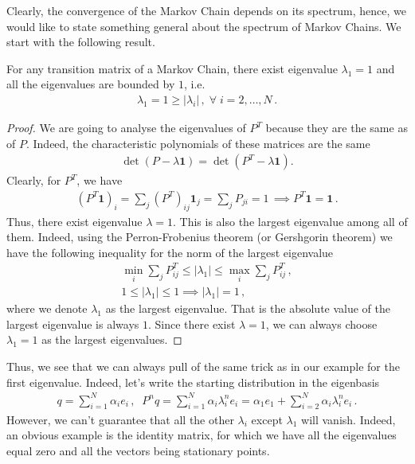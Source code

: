 Clearly, the convergence of the Markov Chain depends on its spectrum, hence, we would like to state something general about the spectrum of Markov Chains. We start with the following result.
\begin{proposition}
    For any transition matrix of a Markov Chain, there exist eigenvalue $\lambda_1 = 1$ and all the eigenvalues are bounded by $1$, i.e.
    \begin{align}
        \lambda_1 = 1 \geq |\lambda_i|\,, \;\forall\; i = 2,\ldots,N\,.
    \end{align}
\end{proposition}
\begin{proof}
    We are going to analyse the eigenvalues of $P^T$ because they are the same as of $P$. Indeed, the characteristic polynomials of these matrices are the same
    \begin{align}
        \det(P - \lambda \mathbf{1}) = \det(P^T - \lambda \mathbf{1}).
    \end{align}
    Clearly, for $P^T$, we have
    \begin{align}
        (P^T\mathbf{1})_i = \sum_{j}(P^T)_{ij}\mathbf{1}_j = \sum_{j}P_{ji} = 1\, \implies P^T\mathbf{1} = \mathbf{1}\,.
    \end{align}
    Thus, there exist eigenvalue $\lambda = 1$. This is also the largest eigenvalue among all of them. Indeed, using the Perron-Frobenius theorem (or Gershgorin theorem) we have the following inequality for the norm of the largest eigenvalue
    \begin{align}
        \min_i \sum_j P^T_{ij}\leq |\lambda_1| \leq \max_i \sum_j P^T_{ij}\,,\\
        1\leq |\lambda_1| \leq 1 \implies |\lambda_1| = 1\,,
    \end{align}
    where we denote $\lambda_1$ as the largest eigenvalue. That is the absolute value of the largest eigenvalue is always $1$. Since there exist $\lambda = 1$, we can always choose $\lambda_1 = 1$ as the largest eigenvalues. 
\end{proof}
Thus, we see that we can always pull of the same trick as in our example for the first eigenvalue. Indeed, let's write the starting distribution in the eigenbasis
\begin{align}
    q = \sum_{i=1}^N\alpha_i e_i\,,\;\; P^nq= \sum_{i=1}^N\alpha_i \lambda_i^n e_i = \alpha_1 e_1 + \sum_{i=2}^N\alpha_i \lambda_i^n e_i\,.
\end{align}
However, we can't guarantee that all the other $\lambda_i$ except $\lambda_1$ will vanish. Indeed, an obvious example is the identity matrix, for which we have all the eigenvalues equal zero and all the vectors being stationary points.


